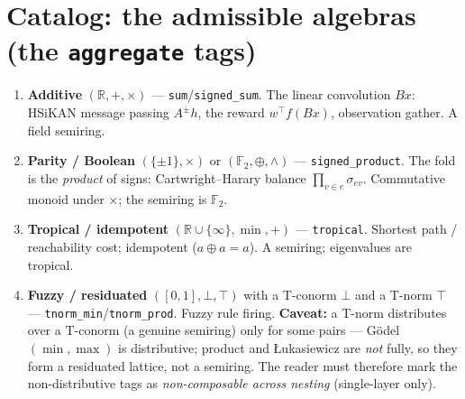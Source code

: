 \documentclass[11pt]{article}
\begin{document}
\section{Catalog: the admissible algebras (the \texttt{aggregate} tags)}
\begin{enumerate}[nosep,leftmargin=1.4em]
  \item \textbf{Additive} $(\mathbb{R},+,\times)$ --- \texttt{sum}/\texttt{signed\_sum}. The linear convolution
        $Bx$: HSiKAN message passing $A^\pm h$, the reward $w^{\!\top}f(Bx)$, observation gather. A field semiring.
  \item \textbf{Parity / Boolean} $(\{\pm1\},\times)$ or $(\mathbb{F}_2,\oplus,\wedge)$ ---
        \texttt{signed\_product}. The fold is the \emph{product} of signs: Cartwright--Harary balance
        $\prod_{v\in e}\sigma_{ev}$. Commutative monoid under $\times$; the semiring is $\mathbb{F}_2$.
  \item \textbf{Tropical / idempotent} $(\mathbb{R}\cup\{\infty\},\min,+)$ --- \texttt{tropical}. Shortest
        path / reachability cost; idempotent ($a\oplus a=a$). A semiring; eigenvalues are tropical.
  \item \textbf{Fuzzy / residuated} $([0,1],\bot,\top)$ with a T-conorm $\bot$ and a T-norm $\top$ ---
        \texttt{tnorm\_min}/\texttt{tnorm\_prod}. Fuzzy rule firing. \textbf{Caveat:} a T-norm distributes over a
        T-conorm (a genuine semiring) only for some pairs --- G\"odel $(\min,\max)$ is distributive; product and
        \L{}ukasiewicz are \emph{not} fully, so they form a residuated lattice, not a semiring. The reader must
        therefore mark the non-distributive tags as \emph{non-composable across nesting} (single-layer only).
\end{enumerate}
\end{document}
